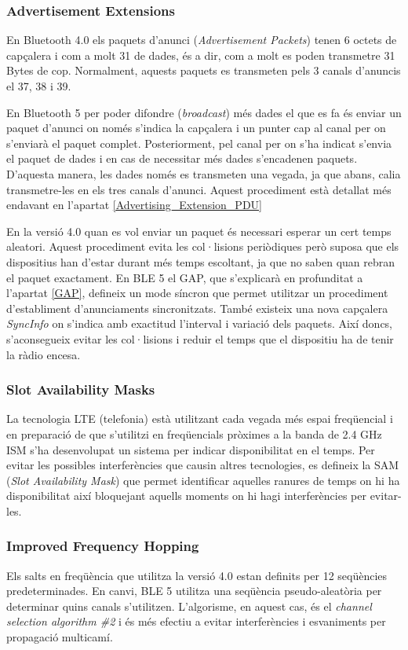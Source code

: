 \subsubsection{Advertisement Extensions}
\label{Advertisement_Extensions}
En Bluetooth 4.0 els paquets d'anunci (\textit{Advertisement Packets}) tenen 6 octets de capçalera i com a molt 31 de dades, és a dir, com a molt es poden transmetre 31 Bytes de cop.
Normalment, aquests paquets es transmeten pels 3 canals d'anuncis el 37, 38 i 39.

En Bluetooth 5 per poder difondre (\textit{broadcast}) més dades el que es fa és enviar un paquet d'anunci on només s'indica la capçalera i un punter cap al canal per on s'enviarà el paquet complet.
Posteriorment, pel canal per on s'ha indicat s'envia el paquet de dades i en cas de necessitar més dades s'encadenen paquets.
D'aquesta manera, les dades només es transmeten una vegada, ja que abans, calia transmetre-les en els tres canals d'anunci.
Aquest procediment està detallat més endavant en l'apartat  \ref{Advertising_Extension_PDU}

En la versió 4.0 quan es vol enviar un paquet és necessari esperar un cert temps aleatori.
Aquest procediment evita les col·lisions periòdiques però suposa que els dispositius han d'estar durant més temps escoltant, ja que no saben quan rebran el paquet exactament.
En BLE 5 el GAP, que s'explicarà en profunditat a l'apartat \ref{GAP}, defineix un mode síncron que permet utilitzar un procediment d'establiment d'anunciaments sincronitzats.
També existeix una nova capçalera \textit{SyncInfo} on s'indica amb exactitud l'interval i variació dels paquets.
Així doncs, s'aconsegueix evitar les col·lisions i reduir el temps que el dispositiu ha de tenir la ràdio encesa.

\subsubsection{Slot Availability Masks}
La tecnologia LTE (telefonia) està utilitzant cada vegada més espai freqüencial i en preparació de que s'utilitzi en freqüencials pròximes a la banda de 2.4 GHz ISM s'ha desenvolupat un sistema per indicar disponibilitat en el temps.
Per evitar les possibles interferències que causin altres tecnologies, es defineix la SAM (\textit{Slot Availability Mask}) que permet identificar aquelles ranures de temps on hi ha disponibilitat així bloquejant aquells moments on hi hagi interferències per evitar-les.

\subsubsection{Improved Frequency Hopping}
Els salts en freqüència que utilitza la versió 4.0 estan definits per 12 seqüències predeterminades.
En canvi, BLE 5 utilitza una seqüència pseudo-aleatòria per determinar quins canals s'utilitzen.
L'algorisme, en aquest cas, és el \textit{channel selection algorithm \#2} i és més efectiu a evitar interferències i esvaniments per propagació multicamí.

